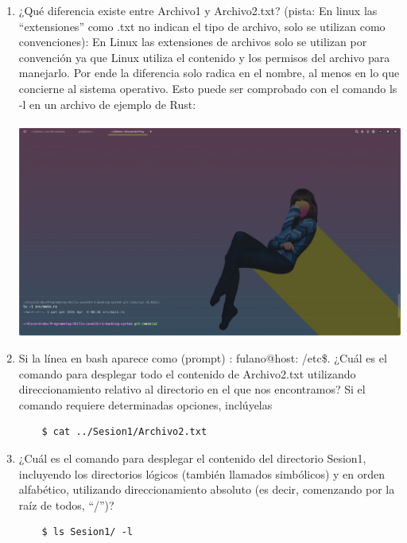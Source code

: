 \documentclass{article}
\begin{document}
\begin{enumerate}
    \item ¿Qué diferencia existe entre Archivo1 y Archivo2.txt? (pista: En linux las “extensiones” como .txt no indican el tipo de archivo, solo se utilizan como convenciones):
    En Linux las extensiones de archivos solo se utilizan por convención ya que Linux utiliza el contenido y los permisos del archivo para manejarlo. Por ende la diferencia solo radica en el nombre, al menos en lo que concierne al sistema operativo. Esto puede ser comprobado con el comando ls -l en un archivo de ejemplo de Rust:
    \\
    \\ 
    \includegraphics[scale=0.25,trim={0 0 20cm 30cm},clip]{LinuxCapturas/permisos.png}
    
    \item Si la línea en bash aparece como (prompt) : fulano@host: /etc\$. ¿Cuál es el comando para desplegar todo el contenido de Archivo2.txt utilizando direccionamiento relativo al directorio en el que nos encontramos? Si el comando requiere determinadas opciones, inclúyelas
    
    \begin{verbatim}
    $ cat ../Sesion1/Archivo2.txt
    \end{verbatim}

    \item ¿Cuál es el comando para desplegar el contenido del directorio Sesion1, incluyendo los directorios lógicos (también llamados simbólicos) y en orden alfabético, utilizando direccionamiento absoluto (es decir, comenzando por la raíz de todos, “/”)?
    
    \begin{verbatim}
    $ ls Sesion1/ -l
    \end{verbatim}


\end{enumerate}
\end{document}

